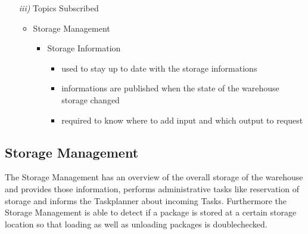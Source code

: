 \documentclass{article}
\begin{document}
\begin{enumerate}
\begin{itemize}
	\end{itemize}
	\item[\textit{iii)}] Topics Subscribed
	\begin{itemize}
		\item Storage Management
		\begin{itemize}
			\item Storage Information
			\begin{itemize}
				\item used to stay up to date with the storage informations
				\item informations are published when the state of the warehouse storage changed
				\item required to know where to add input and which output to request
			\end{itemize}
		\end{itemize}
	\end{itemize}
\end{enumerate}

\subsection{Storage Management}
The Storage Management has an overview of the overall storage of the warehouse and provides those information, performs administrative tasks like reservation of storage and informs the Taskplanner about incoming Tasks. Furthermore the Storage Management is able to detect if a package is stored at a certain
storage location so that loading as well as unloading packages is doublechecked.
\end{document}
